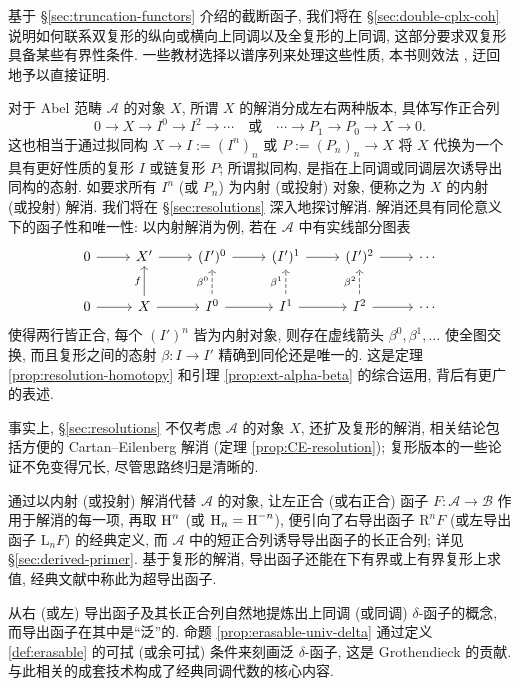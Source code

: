 基于 \S\ref{sec:truncation-functors} 介绍的截断函子, 我们将在 \S\ref{sec:double-cplx-coh} 说明如何联系双复形的纵向或横向上同调以及全复形的上同调, 这部分要求双复形具备某些有界性条件. 一些教材选择以谱序列来处理这些性质, 本书则效法 \cite{KS06}, 迂回地予以直接证明.

对于 Abel 范畴 $\mathcal{A}$ 的对象 $X$, 所谓 $X$ 的解消分成左右两种版本, 具体写作正合列
\[ 0 \to X \to I^0 \to I^2 \to \cdots \quad \text{或} \quad \cdots \to P_1 \to P_0 \to X \to 0. \]
这也相当于通过拟同构 $X \to I := (I^n)_n$ 或 $P := (P_n)_n \to X$ 将 $X$ 代换为一个具有更好性质的复形 $I$ 或链复形 $P$; 所谓拟同构, 是指在上同调或同调层次诱导出同构的态射. 如要求所有 $I^n$ (或 $P_n$) 为内射 (或投射) 对象, 便称之为 $X$ 的内射 (或投射) 解消. 我们将在 \S\ref{sec:resolutions} 深入地探讨解消. 解消还具有同伦意义下的函子性和唯一性: 以内射解消为例, 若在 $\mathcal{A}$ 中有实线部分图表
\[\begin{tikzcd}
	0 \arrow[r] & X' \arrow[r] & (I')^0 \arrow[r] & (I')^1 \arrow[r] & (I')^2 \arrow[r] & \cdots \\
	0 \arrow[r] & X \arrow[u, "f"] \arrow[r] & I^0 \arrow[dashed, u, "{\beta^0}"] \arrow[r] & I^1 \arrow[r] \arrow[dashed, u, "{\beta^1}"] & I^2 \arrow[r] \arrow[dashed, u, "{\beta^2}"] & \cdots 
\end{tikzcd}\]
使得两行皆正合, 每个 $(I')^n$ 皆为内射对象, 则存在虚线箭头 $\beta^0, \beta^1, \ldots$ 使全图交换, 而且复形之间的态射 $\beta: I \to I'$ 精确到同伦还是唯一的. 这是定理 \ref{prop:resolution-homotopy} 和引理 \ref{prop:ext-alpha-beta} 的综合运用, 背后有更广的表述.

事实上, \S\ref{sec:resolutions} 不仅考虑 $\mathcal{A}$ 的对象 $X$, 还扩及复形的解消, 相关结论包括方便的 Cartan--Eilenberg 解消 (定理 \ref{prop:CE-resolution}); 复形版本的一些论证不免变得冗长, 尽管思路终归是清晰的.

通过以内射 (或投射) 解消代替 $\mathcal{A}$ 的对象, 让左正合 (或右正合) 函子 $F: \mathcal{A} \to \mathcal{B}$ 作用于解消的每一项, 再取 $\operatorname{H}^n$ (或 $\operatorname{H}_n = \operatorname{H}^{-n}$), 便引向了右导出函子 $\mathrm{R}^n F$ (或左导出函子 $\mathrm{L}_n F$) 的经典定义, 而 $\mathcal{A}$ 中的短正合列诱导导出函子的长正合列; 详见 \S\ref{sec:derived-primer}. 基于复形的解消, 导出函子还能在下有界或上有界复形上求值, 经典文献中称此为超导出函子.

从右 (或左) 导出函子及其长正合列自然地提炼出上同调 (或同调) $\delta$-函子的概念, 而导出函子在其中是``泛''的. 命题 \ref{prop:erasable-univ-delta} 通过定义 \ref{def:erasable} 的可拭 (或余可拭) 条件来刻画泛 $\delta$-函子, 这是 Grothendieck 的贡献. 与此相关的成套技术构成了经典同调代数的核心内容.

